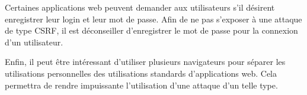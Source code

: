 Certaines applications web peuvent demander aux utilisateurs s'il désirent enregistrer leur login et leur mot de passe. Afin de ne pas s'exposer à une attaque de type CSRF, il est déconseiller d'enregistrer le mot de passe pour la connexion d'un utilisateur.

Enfin, il peut être intéressant d'utiliser plusieurs navigateurs pour séparer les utilisations personnelles des utilisations standards d'applications web. Cela permettra de rendre impuissante l'utilisation d'une attaque d'un telle type.




